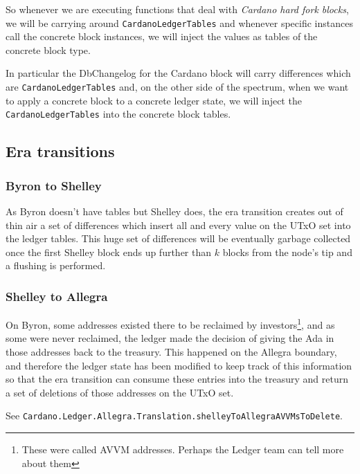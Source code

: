 \documentclass[11pt,a4paper]{article}
\theoremstyle{definition}
\begin{document}
So whenever we are executing functions that deal with \emph{Cardano hard fork
  blocks}, we will be carrying around \texttt{CardanoLedgerTables} and whenever
specific instances call the concrete block instances, we will inject the values
as tables of the concrete block type.

In particular the DbChangelog for the Cardano block will carry differences which
are \texttt{CardanoLedgerTables} and, on the other side of the spectrum, when we
want to apply a concrete block to a concrete ledger state, we will inject the
\texttt{CardanoLedgerTables} into the concrete block tables.

\subsection{Era transitions}

\subsubsection{Byron to Shelley}

As Byron doesn't have tables but Shelley does, the era transition creates out of
thin air a set of differences which insert all and every value on the UTxO set
into the ledger tables. This huge set of differences will be eventually garbage
collected once the first Shelley block ends up further than $k$ blocks from the
node's tip and a flushing is performed.

\subsubsection{Shelley to Allegra}

On Byron, some addresses existed there to be reclaimed by
investors\footnote{These were called AVVM addresses. Perhaps the Ledger team can
  tell more about them}, and as some were never reclaimed, the ledger made the
decision of giving the Ada in those addresses back to the treasury. This
happened on the Allegra boundary, and therefore the ledger state has been
modified to keep track of this information so that the era transition can
consume these entries into the treasury and return a set of deletions of those
addresses on the UTxO set.

See \texttt{Cardano.Ledger.Allegra.Translation.shelleyToAllegraAVVMsToDelete}.



\end{document}
